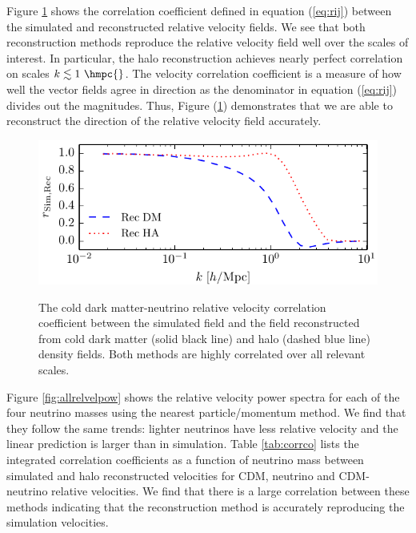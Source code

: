 Figure \ref{fig:relcorr} shows the correlation coefficient defined in equation (\ref{eq:rij}) between the simulated and reconstructed relative velocity fields.  We see that both reconstruction methods reproduce the relative velocity field well over the scales of interest. In particular, the halo reconstruction achieves nearly perfect correlation on scales $k \lesssim 1\ \hmpc{}$.  The velocity correlation coefficient is a measure of how well the vector fields agree in direction as the denominator in equation (\ref{eq:rij}) divides out the magnitudes.  Thus, Figure (\ref{fig:relcorr}) demonstrates that we are able to reconstruct the direction of the relative velocity field accurately.

\begin{figure}[!t]
\begin{center}
\includegraphics[width=\smwidth]{./figures/neutrinos/fig9.pdf} \vspace{-0.1cm}
\caption[Simulated and reconstructed relative velocity correlation coefficient]
{The cold dark matter-neutrino relative velocity
correlation coefficient between the simulated field and the
field reconstructed from cold dark matter (solid black line)
and halo (dashed blue line) density fields. Both methods are
highly correlated over all relevant scales.}
\vspace{-0.2cm}
\label{fig:relcorr}
\end{center}
\end{figure}

Figure \ref{fig:allrelvelpow} shows the relative velocity power spectra for each of the four neutrino masses using the nearest particle/momentum method.  We find that they follow the same trends: lighter neutrinos have less relative velocity and the linear prediction is larger than in simulation.  Table \ref{tab:corrco} lists the integrated correlation coefficients as a function of neutrino mass between simulated and halo reconstructed velocities for CDM, neutrino and CDM-neutrino relative velocities.  We find that there is a large correlation between these methods indicating that the reconstruction method is accurately reproducing the simulation velocities.

